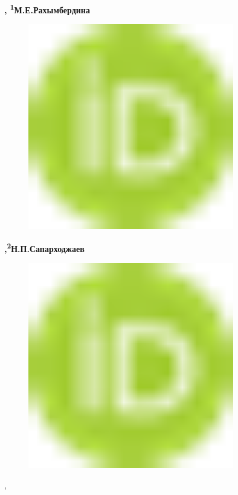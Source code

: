 {\bfseries ,
\textsuperscript{1}М.Е.Рахымбердина}
\begin{figure}[H]
	\centering
	\includegraphics[width=0.8\textwidth]{media/ict2/image1}
	\caption*{}
\end{figure}
{\bfseries \textsuperscript{\envelope },\textsuperscript{2}Н.П.Сапарходжаев}
\begin{figure}[H]
	\centering
	\includegraphics[width=0.8\textwidth]{media/ict2/image1}
	\caption*{}
\end{figure}
,

